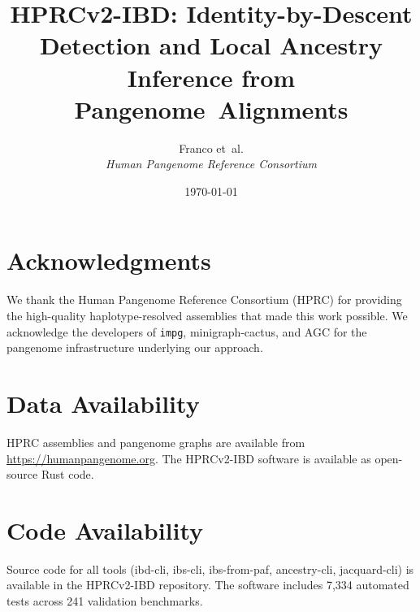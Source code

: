 \documentclass[11pt]{article}
\title{HPRCv2-IBD: Identity-by-Descent Detection and Local Ancestry Inference from Pangenome~Alignments}
\author{
    Franco et~al.\\
    \textit{Human Pangenome Reference Consortium}
}
\date{\today}
\begin{document}
\maketitle
















\section*{Acknowledgments}
We thank the Human Pangenome Reference Consortium (HPRC) for providing the high-quality haplotype-resolved assemblies that made this work possible. We acknowledge the developers of \texttt{impg}, minigraph-cactus, and AGC for the pangenome infrastructure underlying our approach.

\section*{Data Availability}
HPRC assemblies and pangenome graphs are available from \url{https://humanpangenome.org}. The HPRCv2-IBD software is available as open-source Rust code.

\section*{Code Availability}
Source code for all tools (ibd-cli, ibs-cli, ibs-from-paf, ancestry-cli, jacquard-cli) is available in the HPRCv2-IBD repository. The software includes 7{,}334 automated tests across 241 validation benchmarks.



\end{document}
